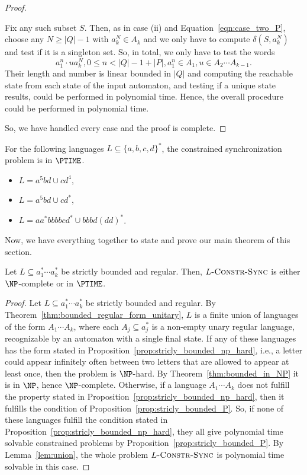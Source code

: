 \begin{proof}
\begin{enumerate}
  Fix any such subset $S$.
  Then, as in case (ii) and Equation~\eqref{eqn:case_two_P}, 
  choose any $N \ge |Q| - 1$ with $a_k^N \in A_k$ and
  we only have to compute $\delta(S, a_k^N)$
  and test if it is a singleton set.
  So, in total, we only have to test the words
  \[
   a_1^n \cdot u a_k^N, 0 \le n < |Q| - 1 + |P|, a_1^n \in A_1, u \in A_2 \cdots A_{k-1}.
  \]
  Their length and number is linear bounded in $|Q|$
  and computing the reachable state from each state of the input automaton,
  and testing if a unique state results, could be performed in polynomial
  time. Hence, the overall procedure could be performed in polynomial time.
 \end{enumerate}
 So, we have handled every case and the proof is complete.
\end{proof}

\begin{example}
 For the following languages $L \subseteq \{a,b,c,d\}^*$, the 
 constrained synchronization problem
 is in $\PTIME$.
 \begin{itemize}
 \item $L = a^5bd \cup cd^4$,
 \item $L = a^5bd \cup cd^*$,
 \item $L = aa^*bbbbcd^* \cup bbbd(dd)^*$.
 \end{itemize}
 \end{example}
 
 
Now, we have everything together to state and prove our main theorem 
of this section.

\begin{theorem}
\label{thm:dichotomy}
 Let $L \subseteq a_1^* \cdots a_k^*$ be strictly bounded and regular.
 Then, $L\textsc{-Constr-Sync}$ is either $\NP$-complete
 or in $\PTIME$.
\end{theorem}
\begin{proof}
 Let $L \subseteq a_1^* \cdots a_k^*$ be strictly bounded and regular.
 By Theorem~\ref{thm:bounded_regular_form_unitary}, 
 $L$ is a finite union of languages of the form $A_1 \cdots A_k$,
 where each $A_j \subseteq a_j^*$ is a non-empty unary regular language, recognizable
 by an automaton with a single final state.
 If any of these languages has the form
 stated in Proposition~\ref{prop:stricly_bounded_np_hard},
 i.e., a letter could appear infinitely often between two letters that
 are allowed to appear at least once, then the problem is $\NP$-hard.
 By Theorem~\ref{thm:bounded_in_NP} it is in $\NP$, hence $\NP$-complete.
 Otherwise, if a language $A_1 \cdots A_k$ does not fulfill
 the property stated in Proposition~\ref{prop:stricly_bounded_np_hard},
 then it fulfills the condition of Proposition~\ref{prop:stricly_bounded_P}.
 So, if none of these languages fulfill the condition
 stated in Proposition~\ref{prop:stricly_bounded_np_hard},
 they all give polynomial time solvable constrained problems
 by Proposition~\ref{prop:stricly_bounded_P}.
 By Lemma~\ref{lem:union}, the whole problem $L\textsc{-Constr-Sync}$
 is polynomial time solvable in this case.
\end{proof}

